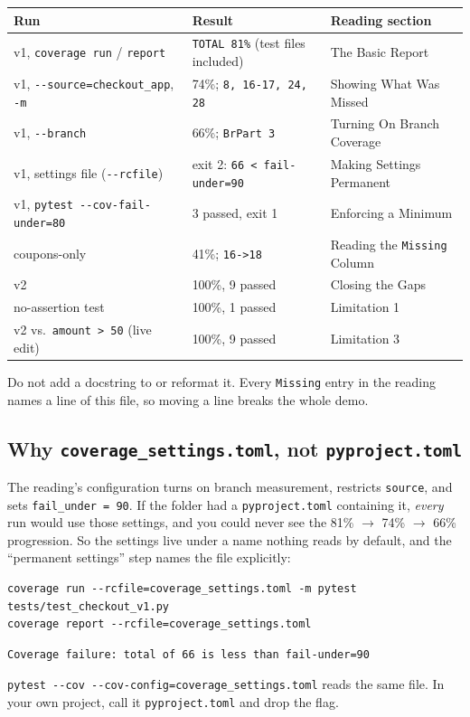 \documentclass[11pt]{article}
\begin{document}
\begin{center}
\footnotesize
\begin{tabular}{@{}L{5.2cm}L{4.4cm}L{5.0cm}@{}}
\toprule
\textbf{Run} & \textbf{Result} & \textbf{Reading section} \\
\midrule
v1, \texttt{coverage run} / \texttt{report} & \texttt{TOTAL 81\%} (test
files included) & The Basic Report \\
v1, \texttt{-{}-source=checkout\_app}, \texttt{-m} & 74\%; \texttt{8,
16-17, 24, 28} & Showing What Was Missed \\
v1, \texttt{-{}-branch} & 66\%; \texttt{BrPart 3} & Turning On Branch
Coverage \\
v1, settings file (\texttt{-{}-rcfile}) & exit 2:
\texttt{66 < fail-under=90} & Making Settings Permanent \\
v1, \texttt{pytest -{}-cov-fail-under=80} & 3 passed, exit 1 & Enforcing
a Minimum \\
coupons-only & 41\%; \texttt{16->18} & Reading the \texttt{Missing}
Column \\
v2 & 100\%, 9 passed & Closing the Gaps \\
no-assertion test & 100\%, 1 passed & Limitation 1 \\
v2 vs.\ \texttt{amount > 50} (live edit) & 100\%, 9 passed & Limitation
3 \\
\bottomrule
\end{tabular}
\end{center}

\begin{warningbox}
Do not add a docstring to  or reformat
it. Every \texttt{Missing} entry in the reading names a line of this
file, so moving a line breaks the whole demo.
\end{warningbox}

\subsection*{Why \texttt{coverage\_settings.toml}, not \texttt{pyproject.toml}}
The reading's configuration turns on branch measurement, restricts
\texttt{source}, and sets \texttt{fail\_under = 90}. If the folder had a
\texttt{pyproject.toml} containing it, \emph{every} run would use those
settings, and you could never see the 81\% $\rightarrow$ 74\%
$\rightarrow$ 66\% progression. So the settings live under a name
nothing reads by default, and the ``permanent settings'' step names the
file explicitly:
\begin{lstlisting}[style=shellstyle]
coverage run --rcfile=coverage_settings.toml -m pytest tests/test_checkout_v1.py
coverage report --rcfile=coverage_settings.toml
\end{lstlisting}
\begin{lstlisting}[style=shellstyle]
Coverage failure: total of 66 is less than fail-under=90
\end{lstlisting}
\texttt{pytest -{}-cov -{}-cov-config=coverage\_settings.toml} reads the
same file. In your own project, call it \texttt{pyproject.toml} and
drop the flag.
\end{document}
